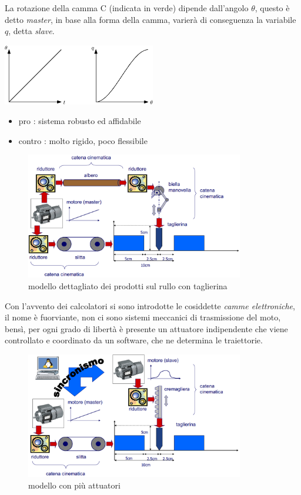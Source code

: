 \documentclass[10pt, letterpaper]{report}
\begin{document}
La rotazione della camma C (indicata in verde) dipende dall'angolo $\theta$, questo è detto \textit{master}, in base alla forma della camma, varierà di conseguenza la variabile $q$, detta \textit{slave}.
\begin{center}
    \includegraphics[width=0.5\textwidth]{images/masterSlave.eps}
\end{center}
\begin{itemize}
    \item pro : sistema robusto ed affidabile 
    \item contro : molto rigido, poco flessibile
\end{itemize}
\begin{figure}[h!]
    \centering 
    \includegraphics[width=0.85\textwidth]{images/modelloMotiSincronizzati.png}
    \caption{modello dettagliato dei prodotti sul rullo con taglierina}
\end{figure}
Con l'avvento dei calcolatori si sono introdotte le cosiddette \textit{camme elettroniche}, il nome è fuorviante, non ci sono sistemi meccanici di trasmissione del moto, bensì, per ogni grado di libertà è presente un attuatore indipendente che viene controllato e coordinato da un software, che ne determina le traiettorie.
\begin{figure}[h!]
    \centering 
    \includegraphics[width=0.85\textwidth]{images/modelloMotiSincronizzati2.png}
    \caption{modello con più attuatori}
\end{figure}
\end{document}
